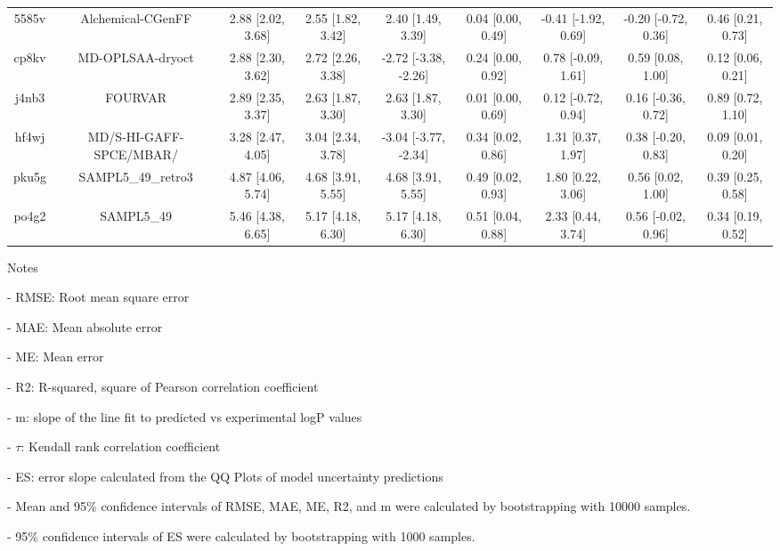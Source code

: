 \documentclass{article}
\begin{document}
\begin{center}
\begin{longtable}{|ccccccccc|}
 5585v &                                  Alchemical-CGenFF &  2.88 [2.02, 3.68] &  2.55 [1.82, 3.42] &     2.40 [1.49, 3.39] &  0.04 [0.00, 0.49] &  -0.41 [-1.92, 0.69] &  -0.20 [-0.72, 0.36] &     0.46 [0.21, 0.73] \\
 cp8kv &                                   MD-OPLSAA-dryoct &  2.88 [2.30, 3.62] &  2.72 [2.26, 3.38] &  -2.72 [-3.38, -2.26] &  0.24 [0.00, 0.92] &   0.78 [-0.09, 1.61] &    0.59 [0.08, 1.00] &     0.12 [0.06, 0.21] \\
 j4nb3 &                                            FOURVAR &  2.89 [2.35, 3.37] &  2.63 [1.87, 3.30] &     2.63 [1.87, 3.30] &  0.01 [0.00, 0.69] &   0.12 [-0.72, 0.94] &   0.16 [-0.36, 0.72] &     0.89 [0.72, 1.10] \\
 hf4wj &                            MD/S-HI-GAFF-SPCE/MBAR/ &  3.28 [2.47, 4.05] &  3.04 [2.34, 3.78] &  -3.04 [-3.77, -2.34] &  0.34 [0.02, 0.86] &    1.31 [0.37, 1.97] &   0.38 [-0.20, 0.83] &     0.09 [0.01, 0.20] \\
 pku5g &                                 SAMPL5\_49\_retro3 &  4.87 [4.06, 5.74] &  4.68 [3.91, 5.55] &     4.68 [3.91, 5.55] &  0.49 [0.02, 0.93] &    1.80 [0.22, 3.06] &    0.56 [0.02, 1.00] &     0.39 [0.25, 0.58] \\
 po4g2 &                                         SAMPL5\_49 &  5.46 [4.38, 6.65] &  5.17 [4.18, 6.30] &     5.17 [4.18, 6.30] &  0.51 [0.04, 0.88] &    2.33 [0.44, 3.74] &   0.56 [-0.02, 0.96] &     0.34 [0.19, 0.52] \\
\end{longtable}
\end{center}

Notes

- RMSE: Root mean square error

- MAE: Mean absolute error

- ME: Mean error

- R2: R-squared, square of Pearson correlation coefficient

- m: slope of the line fit to predicted vs experimental logP values

- $\tau$:  Kendall rank correlation coefficient

- ES: error slope calculated from the QQ Plots of model uncertainty predictions

- Mean and 95\% confidence intervals of RMSE, MAE, ME, R2, and m were calculated by bootstrapping with 10000 samples.

- 95\% confidence intervals of ES were calculated by bootstrapping with 1000 samples.\end{document}
\end{document}
